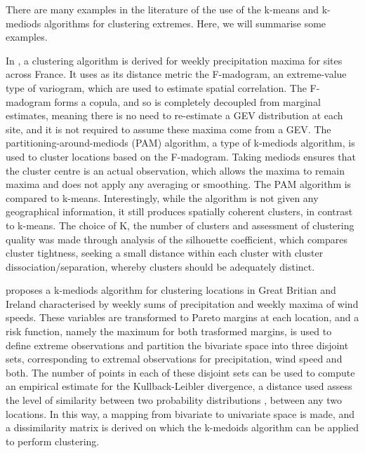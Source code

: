 \documentclass{article}
\numberwithin{equation}{section}
\begin{document}
There are many examples in the literature of the use of the k-means and k-mediods algorithms for clustering extremes.
Here, we will summarise some examples.


In \citet{Bernard2013}, a clustering algorithm is derived for weekly precipitation maxima for sites across France.
It uses as its distance metric the F-madogram, an extreme-value type of variogram, which are used to estimate spatial correlation. 
The F-madogram forms a copula, and so is completely decoupled from marginal estimates, meaning there is no need to re-estimate a GEV distribution at each site, and it is not required to assume these maxima come from a GEV.
The partitioning-around-mediods (PAM) algorithm, a type of k-mediods algorithm, is used to cluster locations based on the F-madogram. 
Taking mediods ensures that the cluster centre is an actual observation, which allows the maxima to remain maxima and does not apply any averaging or smoothing. 
The PAM algorithm is compared to k-means.
Interestingly, while the algorithm is not given any geographical information, it still produces spatially coherent clusters, in contrast to k-means.
The choice of K, the number of clusters and assessment of clustering quality was made through analysis of the silhouette coefficient, which compares cluster tightness, seeking a small distance within each cluster with cluster dissociation/separation, whereby clusters should be adequately distinct.

\citet{Vignotto2021} proposes a k-mediods algorithm for clustering locations in Great Britian and Ireland characterised by weekly sums of precipitation and weekly maxima of wind speeds.
These variables are transformed to Pareto margins at each location, and a risk function, namely the maximum for both trasformed margins, is used to define extreme observations and partition the bivariate space into three disjoint sets, corresponding to extremal observations for precipitation, wind speed and both. 
The number of points in each of these disjoint sets can be used to compute an empirical estimate for the Kullback-Leibler divergence, a distance used assess the level of similarity between two probability distributions \citep{Kullback1951}, between any two locations.
In this way, a mapping from bivariate to univariate space is made, and a dissimilarity matrix is derived on which the k-medoids algorithm can be applied to perform clustering. 
\end{document}

